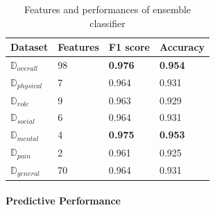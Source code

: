 \documentclass[runningheads]{llncs}
\begin{document}
\begin{table}[h]
\begin{tabular}{|C{3cm}|C{3cm}|C{3cm}|C{3cm}|}
\hline
{} 
{\color[HTML]{333333} \textbf{Dataset}} & {\color[HTML]{333333} \textbf{Features}} & {\color[HTML]{333333} \textbf{F1 score}} & {\color[HTML]{333333} \textbf{Accuracy}} \\ \hline
{} 
\textbf{$\mathbb{D}_{overall}$}& 98  & \textbf{0.976}  & \textbf{0.954} \\ \hline
{} 
\textbf{$\mathbb{D}_{physical}$}& 7  & 0.964  & 0.931 \\ \hline
{} 
\textbf{$\mathbb{D}_{role}$} & 9  & 0.963   & 0.929    \\ \hline
{} 
\textbf{$\mathbb{D}_{social}$} & 6   & 0.964  & 0.931 \\ \hline
{} 
\textbf{$\mathbb{D}_{mental}$ }  & 4  & \textbf{0.975}  & \textbf{0.953}  \\ \hline
{} 
\textbf{$\mathbb{D}_{pain} $ }  & 2  & 0.961  & 0.925  \\ \hline
{} 
\textbf{$\mathbb{D}_{general}$ }  & 70  & 0.964  & 0.931  \\ \hline
\end{tabular}
\caption{Features and performances of ensemble classifier}
\label{subsets}
\end{table}
%
%
\paragraph{Predictive Performance}
%
%
\end{document}
